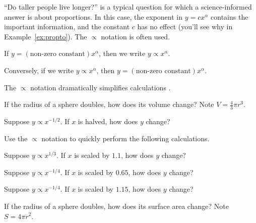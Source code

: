 \documentclass[../main.tex]{subfiles}
\begin{document}
``Do taller people live longer?'' is a typical question for which a science-informed answer is about proportions. In this case, the exponent in \(y = c x^{\alpha}\) contains the important information, and the constant \(c\) has no effect (you'll see why in Example~\ref{ex:propto}). The \(\propto\) notation is often used.
\begin{definition} \label{def:propto}
  If \(y = (\text{non-zero constant}) x^{\alpha}\), then we write \(y \propto x^{\alpha}\). 

  Conversely, if we write \(y \propto x^{\alpha}\), then \(y = (\text{non-zero constant}) x^{\alpha}\).
\end{definition}

\faStar{} The \(\propto\) notation dramatically simplifies calculations .

\begin{example} \label{ex:propto-sphere-volume}
  If the radius of a sphere doubles, how does its volume change? Note \(V = \frac{4}{3} \pi r^{3}\).

  \blanks*
\end{example}

\clearpage
\begin{example} \label{ex:propto-halved}
  Suppose \(y \propto x^{-1/2}\). If \(x\) is halved, how does \(y\) change?

\end{example}

Use the \(\propto\) notation to quickly perform the following calculations.
\begin{exercise} \label{ex:propto-scale-cube-root}
  Suppose \(y \propto x^{1/3}\). If \(x\) is scaled by \(1.1\), how does \(y\) change?

\end{exercise}

\begin{exercise} \label{ex:propto-scale-down}
  Suppose \(y \propto x^{-1/4}\). If \(x\) is scaled by \(0.65\), how does \(y\) change?

\end{exercise}

\begin{exercise} \label{ex:propto-scale-up}
  Suppose \(y \propto x^{-1/4}\). If \(x\) is scaled by \(1.15\), how does \(y\) change?

\end{exercise}

\begin{exercise} \label{ex:propto-sphere-area}
  If the radius of a sphere doubles, how does its surface area change? Note \(S = 4 \pi r^{2}\).

\end{exercise}
\end{document}
